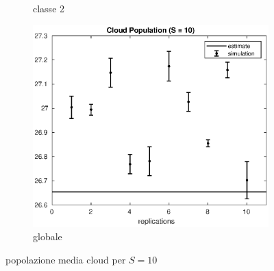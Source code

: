 \begin{figure}[!h]
\begin{subfigure}[t]{0.49\textwidth}
\caption{classe 2}
\label{10_n2cloud}
\end{subfigure}
%
\begin{subfigure}[t]{0.5\textwidth}
\includegraphics[width=\textwidth]{figures/simul/10_500K_ncloud}
\caption{globale}
\label{10_ncloud}
\end{subfigure}
%
\caption{popolazione media cloud per $S = 10$}
\end{figure}
%

